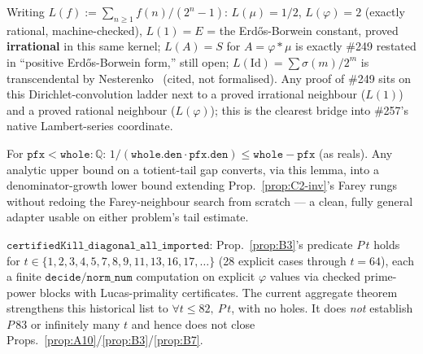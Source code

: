 \begin{prop}\label{prop:D7-inv}
Writing $L(f):=\sum_{n\ge1}f(n)/(2^n-1)$: $L(\mu)=1/2$, $L(\varphi)=2$ (exactly rational,
machine-checked), $L(1)=E$ = the Erd\H os-Borwein constant, proved \textbf{irrational} in this
same kernel; $L(A)=S$ for $A=\varphi*\mu$ is exactly \#249 restated in ``positive
Erd\H os-Borwein form,'' still open; $L(\mathrm{Id})=\sum\sigma(m)/2^m$ is transcendental by
Nesterenko~\cite[Cor.~2, p.~1320]{nesterenko1996} (cited, not formalised). Any proof of \#249 sits on this Dirichlet-convolution
ladder next to a proved irrational neighbour ($L(1)$) and a proved rational neighbour
($L(\varphi)$); this is the clearest bridge into \#257's native Lambert-series coordinate.
\ \ \\
\end{prop}

\begin{prop}\label{prop:D9-inv}
For $\mathtt{pfx}<\mathtt{whole}{:}\mathbb Q$: $1/(\mathtt{whole.den}\cdot\mathtt{pfx.den}) \le \mathtt{whole}-\mathtt{pfx}$
(as reals). Any analytic upper bound on a totient-tail gap converts, via this lemma, into a
denominator-growth lower bound extending Prop.~\ref{prop:C2-inv}'s Farey rungs without redoing the
Farey-neighbour search from scratch — a clean, fully general adapter usable on either problem's
tail estimate.
\ \ \\
\end{prop}

\begin{prop}\label{prop:B11-inv}
$\mathtt{certifiedKill\_diagonal\_all\_imported}$: Prop.~\ref{prop:B3}'s predicate $P\,t$ holds
for $t\in\{1,2,3,4,5,7,8,9,11,13,16,17,\dots\}$ (28 explicit cases through $t=64$), each a finite
$\mathtt{decide}/\mathtt{norm\_num}$ computation on explicit $\varphi$ values via checked
prime-power blocks with Lucas-primality certificates.  The current aggregate
theorem strengthens this historical list to $\forall t\le82,\ P\,t$, with no
holes.  It does \emph{not} establish $P\,83$ or infinitely many $t$ and hence
does not close Props.~\ref{prop:A10}/\ref{prop:B3}/\ref{prop:B7}.
\ \ \\
\end{prop}

